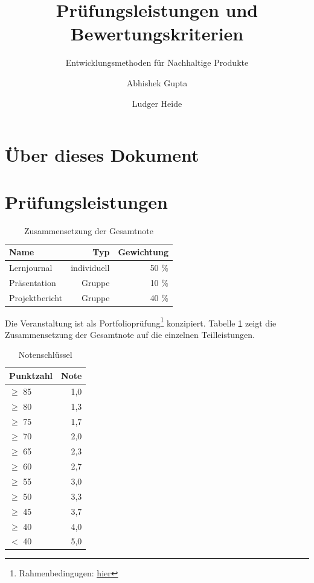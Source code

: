 \documentclass[DIV=15,headinclude]{scrartcl}
\begin{document}
\title{Prüfungsleistungen und Bewertungskriterien}
\subtitle{Entwicklungsmethoden für Nachhaltige Produkte}
\author{Abhishek Gupta \and Ludger Heide}
\maketitle

\tableofcontents


\section{Über dieses Dokument}

\section{Prüfungsleistungen}

\begin{table}
	\centering
	\caption{Zusammensetzung der Gesamtnote}
	\label{tab:zusammensetzung}
	\begin{tabular}{lrr}
		\toprule
		Name & Typ & Gewichtung \\
		\midrule
		Lernjournal & individuell & 50 \% \\		
		Präsentation & Gruppe & 10 \% \\
		Projektbericht & Gruppe & 40 \% \\	
		\bottomrule
	\end{tabular}
\end{table}

Die Veranstaltung ist als Portfolioprüfung\footnote{Rahmenbedingugen: \href{https://www.tu-berlin.de/asv/menue/gremien/kommissionen_des_as/hinweise_zur_allgstupo/hinweise_zu_portfoliopruefungen/}{\underline{hier}}} konzipiert. Tabelle \ref{tab:zusammensetzung} zeigt die Zusammensetzung der Gesamtnote auf die einzelnen Teilleistungen.

\begin{table}
	\centering
	\caption{Notenschlüssel}
	\label{tab:notenschlüssel}
	\begin{tabular}{lr}
		\toprule
		Punktzahl & Note \\
		\midrule
		$\geq$ 85 & 1,0 \\
		$\geq$ 80 & 1,3 \\
		$\geq$ 75 & 1,7 \\
		$\geq$ 70 & 2,0 \\
		$\geq$ 65 & 2,3 \\
		$\geq$ 60 & 2,7 \\
		$\geq$ 55 & 3,0 \\
		$\geq$ 50 & 3,3 \\
		$\geq$ 45 & 3,7 \\
		$\geq$ 40 & 4,0 \\
		$<$ 40  & 5,0 \\
		\bottomrule
	\end{tabular}
\end{table}
\end{document}
